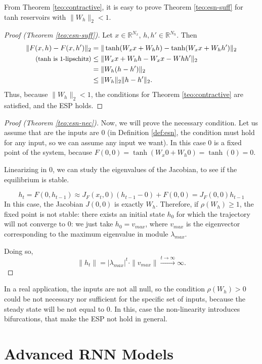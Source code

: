 \documentclass[oneside]{book}
\newcommand{\R}{\mathbb{R}}
\theoremstyle{definition}
\theoremstyle{plain}
\begin{document}
From Theorem \ref{teo:contractive}, it is easy to prove Theorem \ref{teo:esn-suff} for tanh reservoirs with $\|W_h\|_2<1$.
\begin{proof}[Proof (Theorem \ref{teo:esn-suff})]
    Let $x\in \R^{N_x}$, $h, h'\in \R^{N_h}$.
    Then 
    \begin{align*}
        \|F(x, h)-F(x, h')\|_2 &=\|\tanh(W_xx+W_h h)-\tanh(W_xx+W_hh')\|_2 \\
        \text{\small{(tanh is 1-lipschitz)}}&\leq\|W_x x+W_hh-W_xx-Whh'\|_2\\
        & =\|W_h(h-h')\|_2 \\ &\leq\|W_h\|_2\|h-h'\|_2.
    \end{align*}
    Thus, because $\|W_h\|_2<1$, the conditions for Theorem \ref{teo:contractive} are satisfied, and the ESP holds.
\end{proof}
\begin{proof}[Proof (Theorem \ref{teo:esn-nec})]
Now, we will prove the necessary condition. Let us assume that are the inputs are $0$ (in  Definition \ref{def:esn}, the condition must hold for any input, so we can assume any input we want). In this case $0$ is a fixed point of the system, because $F(0,0)=\tanh(W_x0 + W_h 0) = \tanh(0)=0$.

Linearizing in $0$, we can study the eigenvalues of the Jacobian, to see if the equilibrium is stable.

\begin{equation}
    h_t = F(0,h_{t-1})\approx J_F(x_t, 0)(h_{t-1}- 0) + F(0, 0) = J_F(0,0)h_{t-1}
\end{equation}
In this case, the Jacobian $J(0,0)$ is exactly $W_h$.
Therefore, if $\rho(W_h)\geq 1$, the fixed point is not stable: there exists an initial state $h_0$ for which the trajectory will not converge to 0: we just take $h_0 = v_{max}$, where $v_{max}$ is the eigenvector corresponding to the maximum eigenvalue in module $\lambda_{max}$.

Doing so, \[
\|h_t\| = |\lambda_{max}|^t \cdot \|v_{max}\|\xrightarrow{t\to\infty} \infty. \]
\end{proof}

In a real application, the inputs are not all null, so the condition $\rho(W_h)>0$ could be not necessary nor sufficient for the specific set of inputs, because the steady state will be not equal to 0. In this, case the non-linearity introduces bifurcations, that make the ESP not hold in general.

\section{Advanced RNN Models}
\end{document}
